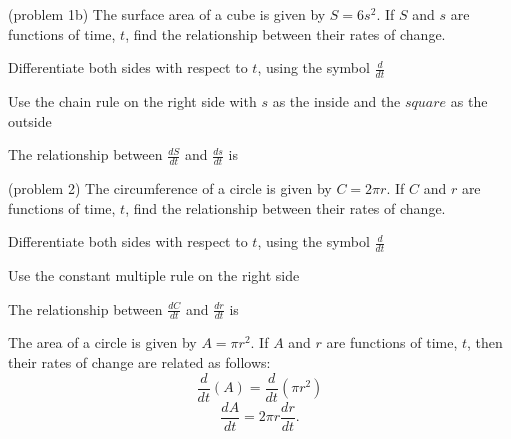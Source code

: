 \documentclass{ximera}
\begin{document}
\begin{problem}(problem 1b)
The surface area of a cube is given by $S = 6s^2$. If $S$ and $s$ are functions of time, $t$, 
find the relationship between their rates of change.\\
\begin{hint}
Differentiate both sides with respect to $t$, using the symbol $\frac{d}{dt}$
\end{hint}
\begin{hint}
Use the chain rule on the right side with $s$ as the inside and the $square$ as the outside
\end{hint}

The relationship between $\frac{dS}{dt}$ and $\frac{ds}{dt}$ is
\begin{multipleChoice}
\end{multipleChoice}
\end{problem}


\begin{problem}(problem 2)
The circumference of a circle is given by $C = 2\pi r$. If $C$ and $r$ are functions of time, $t$,
find the relationship between their rates of change.\\
\begin{hint}
Differentiate both sides with respect to $t$, using the symbol $\frac{d}{dt}$
\end{hint}
\begin{hint}
Use the constant multiple rule on the right side
\end{hint}

The relationship between $\frac{dC}{dt}$ and $\frac{dr}{dt}$ is
\begin{multipleChoice}
\end{multipleChoice}
\end{problem}



\begin{example}[example 3]
The area of a circle is given by $A = \pi r^2$. If $A$ and $r$ are functions of time, $t$, 
then their rates of change are related as follows:
\[\frac{d}{dt} (A) = \frac{d}{dt}(\pi r^2)\]
\[\frac{dA}{dt}  = 2\pi r \frac{dr}{dt}.\]
\end{example}
\end{document}
